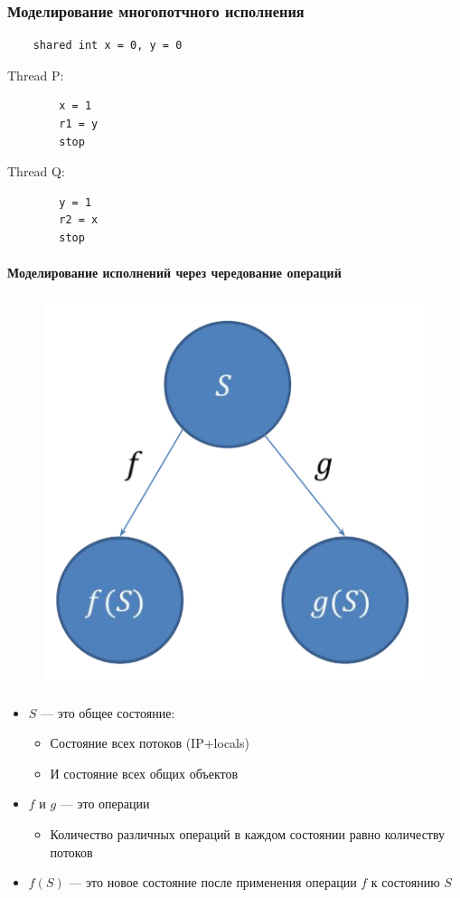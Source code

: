 \documentclass[10pt,a4paper,oneside,titlepage]{article}
\theoremstyle{plain}
\theoremstyle{defenition}
\begin{document}
\subsubsection{Моделирование многопотчного исполнения}

\begin{center}
	\begin{lstlisting}
	shared int x = 0, y = 0
	\end{lstlisting}
\end{center}
	
	\begin{minipage}{0.4\textwidth}
		Thread P:
		
		\begin{lstlisting}
		x = 1
		r1 = y
		stop
		\end{lstlisting}
	\end{minipage}
	\hfill
	\begin{minipage}{0.4\textwidth}
		Thread Q:
		
		\begin{lstlisting}
		y = 1
		r2 = x
		stop
		\end{lstlisting}
	\end{minipage}

\paragraph{Моделирование исполнений через чередование операций}

\begin{figure}[h!]
	\centering
	\includegraphics[width=0.3\linewidth]{pictures/Model}
	\caption{}
	\label{fig:model}
\end{figure}

\begin{itemize}
	\item $S$ --- это общее состояние:
	\begin{itemize}
		\item Состояние всех потоков (IP+locals)
		\item И состояние всех общих объектов
	\end{itemize}
    \item $f$ и $g$ --- это операции
    \begin{itemize}
    	\item Количество различных операций в каждом состоянии равно количеству потоков
    \end{itemize}
    \item $f(S)$ --- это новое состояние после применения операции $f$ к состоянию $S$ 
\end{itemize}
\end{document}
